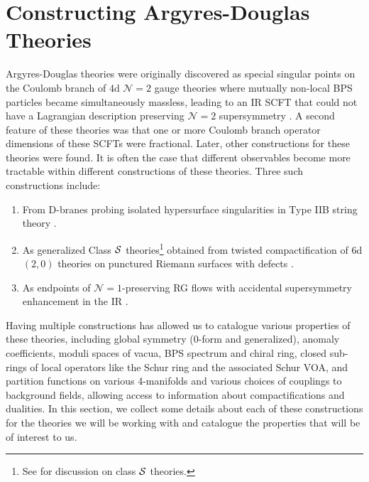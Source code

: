 \documentclass[a4paper,10pt]{article}
\newcommand{\tsf}[1]{\textsf{#1}}
\def\CS {{\cal S}}
\begin{document}
\section{Constructing Argyres-Douglas Theories}\label{sec:AD_intro}
Argyres-Douglas theories were originally discovered as special singular points on the Coulomb branch of 4d $\mathcal{N}=2$ gauge theories where mutually non-local \tsf{BPS} particles became simultaneously massless, leading to an \tsf{IR} \tsf{SCFT} that could not have a Lagrangian description preserving $\mathcal{N}=2$ supersymmetry \cite{Argyres:1995jj,Argyres:1995xn}. A second feature of these theories was that one or more Coulomb branch operator dimensions of these \tsf{SCFT}s were fractional. Later, other constructions for these theories were found. It is often the case that different observables become more tractable within different constructions of these theories. Three such constructions include: 
\begin{enumerate}[(1)]
    \item From D-branes probing isolated hypersurface singularities in Type \tsf{IIB} string theory \cite{Cecotti:2010fi}. 
    \item As generalized Class $\CS$ theories\footnote{See \cite{Witten:1997sc,Gaiotto:2009hg,Gaiotto:2009we} for discussion on class $\CS$ theories.} obtained from twisted compactification of 6d $(2,0)$ theories on punctured Riemann surfaces with defects \cite{Xie:2012hs}.
    \item As endpoints of $\mathcal{N}=1$-preserving \tsf{RG} flows with accidental supersymmetry enhancement in the \tsf{IR} \cite{Maruyoshi:2016aim, Maruyoshi:2016tqk}.
\end{enumerate}    
    Having multiple constructions has allowed us to catalogue various properties of these theories, including global symmetry (0-form and generalized), anomaly coefficients, moduli spaces of vacua, \tsf{BPS} spectrum and chiral ring, closed sub-rings of local operators like the Schur ring and the associated Schur \tsf{VOA}, and partition functions on various 4-manifolds and various choices of couplings to background fields, allowing access to information about compactifications and dualities. In this section, we collect some details about each of these constructions for the theories we will be working with and catalogue the properties that will be of interest to us.  
\end{document}
